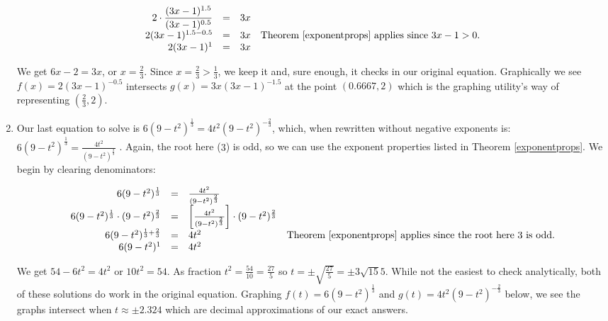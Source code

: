 \begin{ex}
\begin{enumerate}
\[\begin{array}{rclr}
2 \cdot \dfrac{(3x-1)^{1.5}}{(3x-1)^{0.5}} & = & 3x & \\

2 (3x-1)^{1.5-0.5} & = & 3x & \text{Theorem \ref{exponentprops} applies since $3x-1 > 0$.} \\

2 (3x-1)^{1} & = & 3x & \\  \end{array} \]

We get $6x-2 = 3x$, or $x = \frac{2}{3}$.  Since $x = \frac{2}{3} > \frac{1}{3}$, we keep it and, sure enough, it  checks in our original equation. Graphically we see $f(x)=2(3x-1)^{-0.5}$ intersects $g(x) = 3x (3x-1)^{-1.5}$ at the point $(0.6667, 2)$ which is the graphing utility's way of representing $\left(\frac{2}{3}, 2\right)$.

\item  Our last equation to solve is $6(9-t^2)^{\frac{1}{3}} = 4t^2 (9-t^2)^{-\frac{2}{3}}$, which, when rewritten without negative exponents is: $6(9-t^2)^{\frac{1}{3}} = \frac{4t^2}{(9-t^2)^{\frac{2}{3}}}$  .   Again, the root here ($3$) is odd, so we can use the exponent properties listed in Theorem \ref{exponentprops}.   We begin by clearing denominators: 


\[ \begin{array}{rclr}

6(9-t^2)^{\frac{1}{3}} & = & \frac{4t^2}{(9-t^2)^{\frac{2}{3}}} & \\

6(9-t^2)^{\frac{1}{3}} \cdot (9-t^2)^{\frac{2}{3}} & = & \left[   \frac{4t^2}{(9-t^2)^{\frac{2}{3}}}  \right ] \cdot (9-t^2)^{\frac{2}{3}} & \\

6(9-t^2)^{\frac{1}{3} + \frac{2}{3}}& = & 4t^2 &  \text{Theorem \ref{exponentprops} applies since the root here $3$ is odd.} \\

6(9-t^2)^{1} & = & 4t^2 &\\   \end{array} \]

We get $54 - 6t^2 = 4t^2$ or $10t^2 = 54$.  As fraction $t^2 = \frac{54}{10} = \frac{27}{5}$ so $t = \pm \sqrt{\frac{27}{5}} = \pm 3 \sqrt{15}{5}$.  While not the easiest to check analytically, both of these solutions do work in the original equation.  Graphing $f(t) = 6(9-t^2)^{\frac{1}{3}} $ and $g(t) =  4t^2 (9-t^2)^{-\frac{2}{3}}$ below, we see the graphs intersect when $t \approx \pm 2.324$ which are decimal approximations of our exact answers.


\end{enumerate}
\end{ex}
